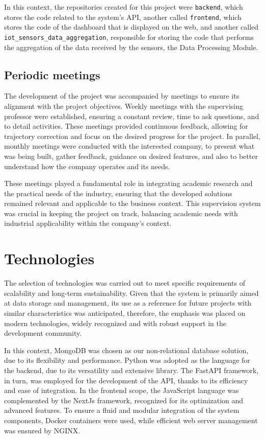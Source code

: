 In this context, the repositories created for this project were \texttt{backend}, which stores the code related to the system's \gls{API}, another called \texttt{frontend}, which stores the code of the dashboard that is displayed on the web, and another called \texttt{iot\_sensors\_data\_aggregation}, responsible for storing the code that performs the aggregation of the data received by the sensors, the Data Processing Module.

\subsection{Periodic meetings}
The development of the project was accompanied by meetings to ensure its alignment with the project objectives. Weekly meetings with the supervising professor were established, ensuring a constant review, time to ask questions, and to detail activities. These meetings provided continuous feedback, allowing for trajectory correction and focus on the desired progress for the project. In parallel, monthly meetings were conducted with the interested company, to present what was being built, gather feedback, guidance on desired features, and also to better understand how the company operates and its needs.

These meetings played a fundamental role in integrating academic research and the practical needs of the industry, ensuring that the developed solutions remained relevant and applicable to the business context. This supervision system was crucial in keeping the project on track, balancing academic needs with industrial applicability within the company's context.

\section[Tecnologias]{Technologies}
The selection of technologies was carried out to meet specific requirements of scalability and long-term sustainability. Given that the system is primarily aimed at data storage and management, its use as a reference for future projects with similar characteristics was anticipated, therefore, the emphasis was placed on modern technologies, widely recognized and with robust support in the development community.

In this context, MongoDB was chosen as our non-relational database solution, due to its flexibility and performance. Python was adopted as the language for the backend, due to its versatility and extensive library. The FastAPI framework, in turn, was employed for the development of the \gls{API}, thanks to its efficiency and ease of integration. In the frontend scope, the JavaScript language was complemented by the NextJs framework, recognized for its optimization and advanced features. To ensure a fluid and modular integration of the system components, Docker containers were used, while efficient web server management was ensured by NGINX.

